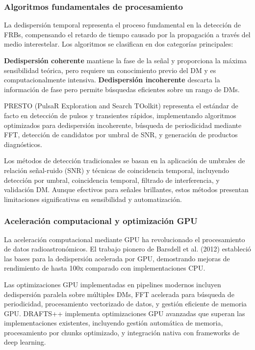 \subsubsection{Algoritmos fundamentales de procesamiento}

La dedispersión temporal representa el proceso fundamental en la detección de FRBs, compensando el retardo de tiempo causado por la propagación a través del medio interestelar. Los algoritmos se clasifican en dos categorías principales:

\textbf{Dedispersión coherente} mantiene la fase de la señal y proporciona la máxima sensibilidad teórica, pero requiere un conocimiento previo del DM y es computacionalmente intensiva. \textbf{Dedispersión incoherente} descarta la información de fase pero permite búsquedas eficientes sobre un rango de DMs.

PRESTO (PulsaR Exploration and Search TOolkit) \cite{Ransom_2003} representa el estándar de facto en detección de pulsos y transientes rápidos, implementando algoritmos optimizados para dedispersión incoherente, búsqueda de periodicidad mediante FFT, detección de candidatos por umbral de SNR, y generación de productos diagnósticos.

Los métodos de detección tradicionales se basan en la aplicación de umbrales de relación señal-ruido (SNR) y técnicas de coincidencia temporal, incluyendo detección por umbral, coincidencia temporal, filtrado de interferencia, y validación DM. Aunque efectivos para señales brillantes, estos métodos presentan limitaciones significativas en sensibilidad y automatización.

\subsubsection{Aceleración computacional y optimización GPU}

La aceleración computacional mediante GPU ha revolucionado el procesamiento de datos radioastronómicos. El trabajo pionero de Barsdell et al. (2012) \cite{Barsdell_2012} estableció las bases para la dedispersión acelerada por GPU, demostrando mejoras de rendimiento de hasta 100x comparado con implementaciones CPU.

Las optimizaciones GPU implementadas en pipelines modernos incluyen dedispersión paralela sobre múltiples DMs, FFT acelerada para búsqueda de periodicidad, procesamiento vectorizado de datos, y gestión eficiente de memoria GPU. DRAFTS++ implementa optimizaciones GPU avanzadas que superan las implementaciones existentes, incluyendo gestión automática de memoria, procesamiento por chunks optimizado, y integración nativa con frameworks de deep learning.

